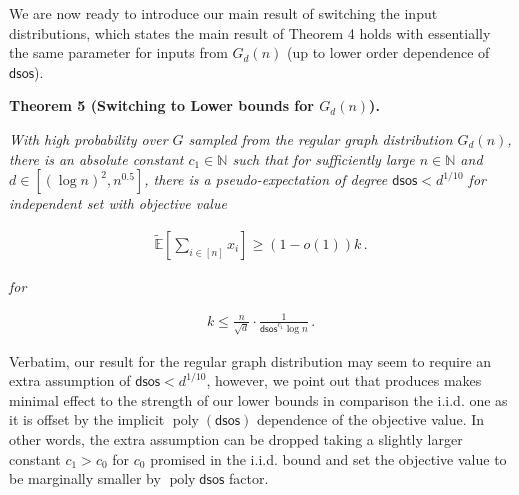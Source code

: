 


We are now ready to introduce our main result of switching the input distributions, which states the main result of Theorem 4 holds with essentially the same parameter for inputs from $G_{d}(n)$ (up to lower order dependence of $\mathsf{dsos}$).\par





\par\medskip\noindent\textbf{
\textbf{Theorem 5}\textbf{ }(Switching to Lower bounds for $G_{d}(n)$)\textbf{.}
}\par



\emph{With high probability over $G$ sampled from the regular graph distribution $G_{d}(n)$, there is an absolute constant $c_{1}\in\mathbb{N}$ such that for sufficiently large $n\in\mathbb{N}$ and $d\in[(\log n)^{2},n^{0.5}]$, there is a pseudo-expectation of degree $\mathsf{dsos}<d^{1/10}$ for independent set with objective value}\par


\[\begin{gathered}
\widetilde{\mathbb{E}}[\sum_{i\in[n]}x_{i}]\geq(1-o(1))k\,.
\end{gathered}\]


\emph{for}\par


\[\begin{gathered}
k\leq\frac{n}{\sqrt{d}}\cdot\frac{1}{\mathsf{dsos}^{c_{1}}\log n}\,.
\end{gathered}\]






Verbatim, our result for the regular graph distribution may seem to require an extra assumption of $\mathsf{dsos}<d^{1/10}$, however, we point out that produces makes minimal effect to the strength of our lower bounds in comparison the i.i.d. one as it is offset by the implicit $\operatorname{poly}(\mathsf{dsos})$ dependence of the objective value. In other words, the extra assumption can be dropped taking a slightly larger constant $c_{1}>c_{0}$ for $c_{0}$ promised in the i.i.d. bound and set the objective value to be marginally smaller by $\operatorname{poly}\mathsf{dsos}$ factor.\par






